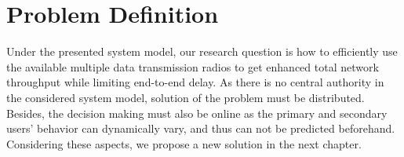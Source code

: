 \section{Problem Definition}

Under the presented system model, our research question is how to efficiently use the available multiple data transmission radios to get enhanced total network throughput while limiting end-to-end delay. As there is no central authority in the considered system model, solution of the problem must be distributed. Besides, the decision making must also be online as the primary and secondary users' behavior can dynamically vary, and thus can not be predicted beforehand. Considering these aspects, we propose a new solution in the next chapter.
\endinput
